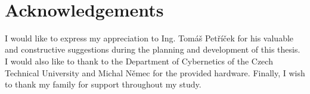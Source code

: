 ~\vfill{}

\section*{Acknowledgements}

I would like to express my appreciation to Ing. Tomáš Petříček for his valuable and constructive suggestions during the planning and development of this thesis. I would also like to thank to the Department of Cybernetics of the Czech Technical University and Michal Němec for the provided hardware. Finally, I wish to thank my family for support throughout my study.

\vspace{2.5cm}

\newpage{}
